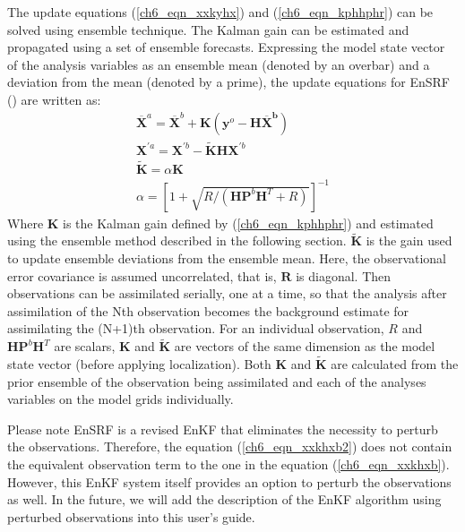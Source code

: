 The update equations (\ref{ch6_eqn_xxkyhx}) and (\ref{ch6_eqn_kphhphr}) can be solved using ensemble technique. The Kalman gain can be estimated and propagated using a set of ensemble forecasts. Expressing the model state vector of the analysis variables as an ensemble mean (denoted by an overbar) and a deviation from the mean (denoted by a prime), the update equations for EnSRF (\cite{Whitaker2002}) are written as:
\begin{eqnarray}
\overline{\pmb{X}}^a = \overline{\pmb{X}}^b + \pmb{K} (\pmb{y}^o - \pmb{H\overline{X}^b} )  \label{ch6_eqn_xxkhxb} \\
\pmb{X}^{\prime a} = \pmb{X}^{\prime b} - \tilde{\pmb{K}} \pmb{H} \pmb{X}^{\prime b}    \label{ch6_eqn_xxkhxb2} \\
\tilde{\pmb{K}} = \alpha \pmb{K}  \label{ch6_eqn_kak } \\
\alpha = \left[ 1+\sqrt{R/( \pmb{HP}^b \pmb{H}^T  +R)} \right]^{-1} \label{ch6_eqn_a11rhphr}
\end{eqnarray}
Where 
$\pmb{K}$ is the Kalman gain defined by (\ref{ch6_eqn_kphhphr}) and estimated using the ensemble method described in the following section.
$\pmb{\tilde{K}}$ is the gain used to update ensemble deviations from the ensemble mean. 
Here, the observational error covariance is assumed uncorrelated, that is, $\pmb{R}$ is diagonal. Then observations can be assimilated serially, one at a time, so that the analysis after assimilation of the Nth observation becomes the background estimate for assimilating the (N+1)th observation.
For an individual observation, $R$ and $\pmb{H} \pmb{P}^{b} \pmb{H}^{T} $ are scalars, $\pmb{K}$ and $\pmb{\tilde{K}}$ are vectors of the same dimension as the model state vector (before applying localization). Both $\pmb{K}$ and $\pmb{\tilde{K}}$ are calculated from the prior ensemble of the observation being assimilated and each of the analyses variables on the model grids individually.

Please note EnSRF is a revised EnKF that eliminates the necessity to perturb the observations. Therefore, the equation (\ref{ch6_eqn_xxkhxb2}) does not contain the equivalent observation term to the one in the equation (\ref{ch6_eqn_xxkhxb}). However, this EnKF system itself provides an option to perturb the observations as well. In the future, we will add the description of the EnKF algorithm using perturbed observations into this user's guide.

